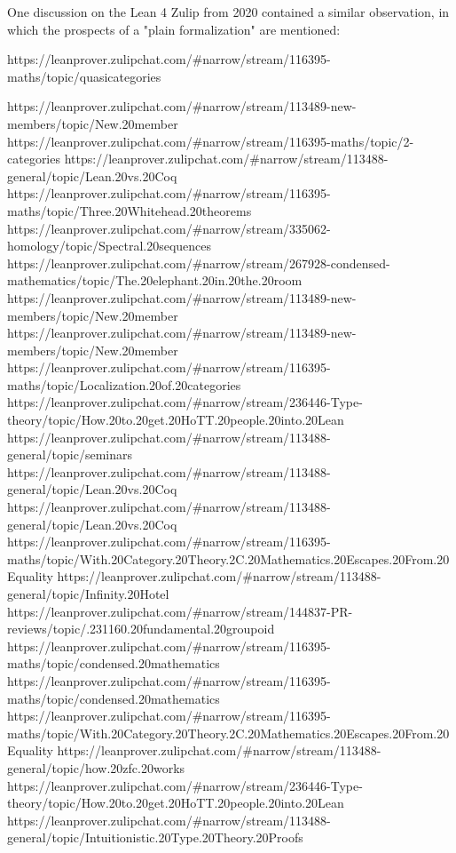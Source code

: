 \documentclass{book}
\begin{document}
\iffalse
https://leanprover.zulipchat.com/#narrow/stream/116395-maths/topic/2-categories
\fi


\iffalse
The concept of a model . 
e like quite a large API design project.
\fi

\iffalse
On the other hand, a more careful inspection of the existing approaches reveals a contrasting problem, namely that... divisiveness has resulted in .

\begin{enumerate}
\item 
\end{enumerate}
\fi

One discussion on the Lean 4 Zulip from 2020 contained a similar observation, in which the prospects of a "plain formalization" are mentioned:

https://leanprover.zulipchat.com/#narrow/stream/116395-maths/topic/quasicategories

\iffalse
https://leanprover.zulipchat.com/#narrow/stream/113489-new-members/topic/New.20member
https://leanprover.zulipchat.com/#narrow/stream/116395-maths/topic/2-categories
https://leanprover.zulipchat.com/#narrow/stream/113488-general/topic/Lean.20vs.20Coq
https://leanprover.zulipchat.com/#narrow/stream/116395-maths/topic/Three.20Whitehead.20theorems
https://leanprover.zulipchat.com/#narrow/stream/335062-homology/topic/Spectral.20sequences
https://leanprover.zulipchat.com/#narrow/stream/267928-condensed-mathematics/topic/The.20elephant.20in.20the.20room
https://leanprover.zulipchat.com/#narrow/stream/113489-new-members/topic/New.20member
https://leanprover.zulipchat.com/#narrow/stream/113489-new-members/topic/New.20member
https://leanprover.zulipchat.com/#narrow/stream/116395-maths/topic/Localization.20of.20categories
https://leanprover.zulipchat.com/#narrow/stream/236446-Type-theory/topic/How.20to.20get.20HoTT.20people.20into.20Lean
https://leanprover.zulipchat.com/#narrow/stream/113488-general/topic/seminars
https://leanprover.zulipchat.com/#narrow/stream/113488-general/topic/Lean.20vs.20Coq
https://leanprover.zulipchat.com/#narrow/stream/113488-general/topic/Lean.20vs.20Coq
https://leanprover.zulipchat.com/#narrow/stream/116395-maths/topic/With.20Category.20Theory.2C.20Mathematics.20Escapes.20From.20Equality
https://leanprover.zulipchat.com/#narrow/stream/113488-general/topic/Infinity.20Hotel
https://leanprover.zulipchat.com/#narrow/stream/144837-PR-reviews/topic/.231160.20fundamental.20groupoid
https://leanprover.zulipchat.com/#narrow/stream/116395-maths/topic/condensed.20mathematics
https://leanprover.zulipchat.com/#narrow/stream/116395-maths/topic/condensed.20mathematics
https://leanprover.zulipchat.com/#narrow/stream/116395-maths/topic/With.20Category.20Theory.2C.20Mathematics.20Escapes.20From.20Equality
https://leanprover.zulipchat.com/#narrow/stream/113488-general/topic/how.20zfc.20works
https://leanprover.zulipchat.com/#narrow/stream/236446-Type-theory/topic/How.20to.20get.20HoTT.20people.20into.20Lean
https://leanprover.zulipchat.com/#narrow/stream/113488-general/topic/Intuitionistic.20Type.20Theory.20Proofs
\end{document}
